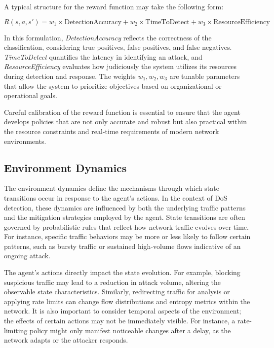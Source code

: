 \documentclass[12pt]{report}
\begin{document}
A typical structure for the reward function may take the following form:

\begin{equation}
R(s, a, s') = w_{1} \times \text{DetectionAccuracy} + w_{2} \times \text{TimeToDetect} + w_{3} \times \text{ResourceEfficiency}
\end{equation}

In this formulation, \textit{DetectionAccuracy} reflects the correctness of the classification, considering true positives, false positives, and false negatives. \textit{TimeToDetect} quantifies the latency in identifying an attack, and \textit{ResourceEfficiency} evaluates how judiciously the system utilizes its resources during detection and response. The weights \(w_{1}, w_{2}, w_{3}\) are tunable parameters that allow the system to prioritize objectives based on organizational or operational goals.

Careful calibration of the reward function is essential to ensure that the agent develops policies that are not only accurate and robust but also practical within the resource constraints and real-time requirements of modern network environments.


\subsection{Environment Dynamics}

The environment dynamics define the mechanisms through which state transitions occur in response to the agent’s actions. In the context of DoS detection, these dynamics are influenced by both the underlying traffic patterns and the mitigation strategies employed by the agent. State transitions are often governed by probabilistic rules that reflect how network traffic evolves over time. For instance, specific traffic behaviors may be more or less likely to follow certain patterns, such as bursty traffic or sustained high-volume flows indicative of an ongoing attack.

The agent’s actions directly impact the state evolution. For example, blocking suspicious traffic may lead to a reduction in attack volume, altering the observable state characteristics. Similarly, redirecting traffic for analysis or applying rate limits can change flow distributions and entropy metrics within the network. It is also important to consider temporal aspects of the environment; the effects of certain actions may not be immediately visible. For instance, a rate-limiting policy might only manifest noticeable changes after a delay, as the network adapts or the attacker responds.
\end{document}
